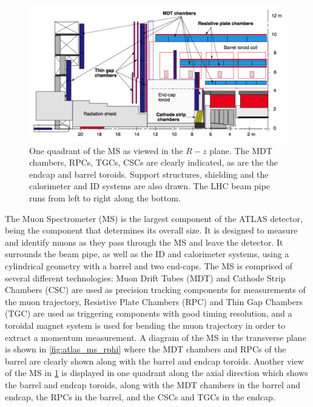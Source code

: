 \begin{figure}[ht]
\centering
\includegraphics[width=.8\textwidth]{figures/atlas/ms_rz}
\caption{One quadrant of the MS as viewed in the $R-z$ plane. The
MDT chambers, RPCs, TGCs, CSCs are clearly indicated, as are the 
the endcap and barrel toroids. Support structures, shielding and the calorimeter
and ID systems are also drawn. The LHC beam pipe runs from left to right
along the bottom.}
\label{fig:atlas_ms_rz}
\end{figure}

The Muon Spectrometer (MS) is the largest component of the ATLAS
detector, being the component that determines its overall size. 
It is designed to measure and identify muons as they
pass through the MS and leave the detector.
It surrounds the beam pipe, as well as the ID and calorimeter systems,
using a cylindrical geometry with a barrel and two end-caps. 
The MS is comprised of several different technologies:
Muon Drift Tubes (MDT) and Cathode Strip Chambers (CSC) are used as
precision tracking components for measurements of the muon 
trajectory, Resistive Plate Chambers (RPC) and 
Thin Gap Chambers (TGC) are used as triggering 
components with good timing resolution, 
and a toroidal magnet system is used for bending the muon trajectory 
in order to extract a momentum measurement.
A diagram of the MS in the transverse plane is shown in 
\fig\ref{fig:atlas_ms_rphi} where the MDT chambers and RPCs of the barrel
are clearly shown along with the barrel and endcap toroids.
Another view of the MS in \fig\ref{fig:atlas_ms_rz} is displayed in
one quadrant along the axial direction which
shows the barrel and endcap toroids, along with 
the MDT chambers in the barrel and endcap, the RPCs in the
barrel, and the CSCs and TGCs in the endcap.

